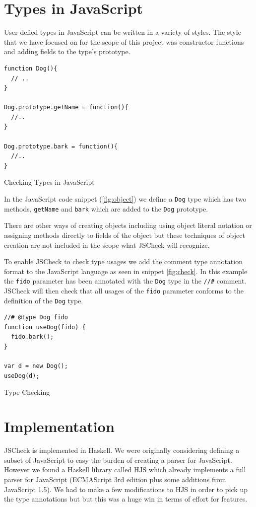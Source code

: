 \documentclass{article}
\begin{document}
\section{Types in JavaScript}
\label{sec:types}
User defied types in JavaScript can be written in a variety of styles. The style
that we have focused on for the scope of this project was constructor functions and
adding fields to the type's prototype.

\begin{program}
\begin{verbatim}
function Dog(){
  // ..
}

Dog.prototype.getName = function(){
  //..
}

Dog.prototype.bark = function(){
  //..
}
\end{verbatim}
\caption{Checking Types in JavaScript}
\label{fig:object}
\end{program}

In the JavaScript code snippet (\ref{fig:object}) we define a {\tt Dog} type
which has two methods, {\tt getName} and {\tt bark} which are added to the {\tt Dog}
prototype.

There are other ways of creating objects including using object literal notation
or assigning methods directly to fields of the object but these techniques of 
object creation are not included in the scope what JSCheck will recognize.

To enable JSCheck to check type usages we add the comment type annotation
format to the JavaScript language as seen in snippet \ref{fig:check}. In
this example the {\tt fido} parameter has been annotated with the {\tt Dog}
type in the {\tt //\#} comment. JSCheck will then check that all usages of
the {\tt fido} parameter conforms to the definition of the {\tt Dog} type.

\begin{program}
\begin{verbatim}
//# @type Dog fido
function useDog(fido) {
  fido.bark();
}

var d = new Dog();
useDog(d);
\end{verbatim}
\caption{Type Checking}
\label{fig:check}
\end{program}


\section{Implementation}
\label{sec:implementation}
JSCheck is implemented in Haskell. We were originally considering defining a 
subset of JavaScript to easy the burden of creating a parser for JavaScript. 
However we found a Haskell library called HJS \cite{hjsLibrary} 
which already implements a full parser for JavaScript (ECMAScript 3rd edition plus 
some additions from JavaScript 1.5). We had to make a few modifications to
HJS in order to pick up the type annotations but but this was a huge win
in terms of effort for features.
\end{document}
